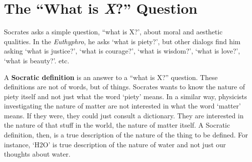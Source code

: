 \documentclass[oneside]{article}
\begin{document}


%

\section*{The ``What is \emph{X}?'' Question}

Socrates asks a simple question, ``what is X?', about moral and aesthetic qualities. In the \emph{Euthyphro}, he asks `what is piety?', but other dialogs find him asking `what is justice?', `what is courage?', `what is wisdom?', `what is love?', `what is beauty?'. etc.

A \textbf{Socratic definition} is an answer to a ``what is X?'' question. These definitions are not of words, but of things. Socrates wants to know the nature of piety itself and not just what the word `piety' means. In a similar way, physicists investigating the nature of matter are not interested in what the word `matter' means. If they were, they could just consult a dictionary. They are interested in the nature of that stuff in the world, the nature of matter itself.  A Socratic definition, then, is a true description of the nature of the thing to be defined. For instance, `H2O' is true description of the nature of water and not just our thoughts about water. 

\end{document}
